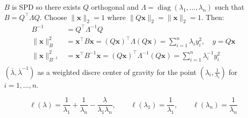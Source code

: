 $B$ is SPD so there exists $Q$ orthogonal and $\Lambda = \operatorname{diag}(\lambda_1, \ldots, \lambda_n)$ such that $B = Q^{\top}\Lambda Q$. Choose $\|\mathbf{x}\|_2 = 1$ where $\|Q \mathbf{x}\|_2 = \|\mathbf{x}\|_2 = 1$. Then:
\begin{align*}
    B^{-1}                    & = Q^{\top} \Lambda^{-1} Q                                                                                                           \\
    \|\mathbf{x}\|_B^2        & = \mathbf{x}^{\top} B \mathbf{x} = (Q\mathbf{x})^{\top} \Lambda (Q\mathbf{x}) = \sum_{i=1}^n \lambda_i y_i^2, \quad y = Q\mathbf{x} \\
    \|\mathbf{x}\|_{B^{-1}}^2 & = \mathbf{x}^{\top} B^{-1} \mathbf{x} = (Q\mathbf{x})^{\top} \Lambda^{-1} (Q\mathbf{x}) = \sum_{i=1}^n \lambda_i^{-1} y_i^2         \\
\end{align*}
$(\overline{\lambda}, \overline{\lambda}^{-1})$ as a weighted discre center of gravity for the point $(\lambda_i, \frac{1}{\lambda_i})$ for $i = 1, \ldots, n$.

\[ \ell(\lambda) = \frac{1}{\lambda_1} + \frac{1}{\lambda_n} - \frac{\lambda}{\lambda_1 \lambda_n}, \qquad \ell(\lambda_1) = \frac{1}{\lambda_1}, \qquad \ell(\lambda_n) = \frac{1}{\lambda_n} \]

